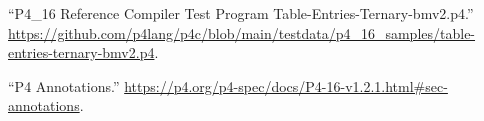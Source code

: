 \documentclass[11pt]{article}
\begin{document}
{{\begin{thebibliography}{45}
\mdbibitemlabel{{}[16]}\textquotedblleft{}P4\_16 Reference Compiler Test Program Table-Entries-Ternary-bmv2.p4.\textquotedblright{} \href{https://github.com/p4lang/p4c/blob/main/testdata/p4_16_samples/table-entries-ternary-bmv2.p4}{{\ttfamily https://\hspace{0pt}github.\hspace{0pt}com/\hspace{0pt}p4lang/\hspace{0pt}p4c/\hspace{0pt}blob/\hspace{0pt}main/\hspace{0pt}testdata/\hspace{0pt}p4\_\hspace{0pt}16\_\hspace{0pt}samples/\hspace{0pt}table-\hspace{0pt}entries-\hspace{0pt}ternary-\hspace{0pt}bmv2.\hspace{0pt}p4}}.\label{p4ctestprogramforconstentries}%

\mdbibitemlabel{{}[17]}\textquotedblleft{}P4 Annotations.\textquotedblright{} \href{https://p4.org/p4-spec/docs/P4-16-v1.2.1.html\%23sec-annotations}{{\ttfamily https://\hspace{0pt}p4.\hspace{0pt}org/\hspace{0pt}p4-\hspace{0pt}spec/\hspace{0pt}docs/\hspace{0pt}P4-\hspace{0pt}16-\hspace{0pt}v1.\hspace{0pt}2.\hspace{0pt}1.\hspace{0pt}html\#\hspace{0pt}sec-\hspace{0pt}annotations}}.\label{p4annotations}%


\end{thebibliography}}}
\end{document}
